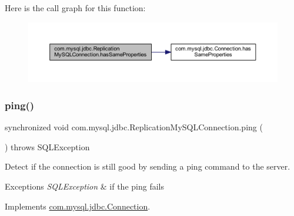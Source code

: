 Here is the call graph for this function\+:
\nopagebreak
\begin{figure}[H]
\begin{center}
\leavevmode
\includegraphics[width=350pt]{classcom_1_1mysql_1_1jdbc_1_1_replication_my_s_q_l_connection_a6add28fadea7fd82449464de48062955_cgraph}
\end{center}
\end{figure}
\mbox{\label{classcom_1_1mysql_1_1jdbc_1_1_replication_my_s_q_l_connection_a2cf454e00e9fe6dcb74bb37405562e6d}} 
\subsubsection{\texorpdfstring{ping()}{ping()}}
{\footnotesize\ttfamily synchronized void com.\+mysql.\+jdbc.\+Replication\+My\+S\+Q\+L\+Connection.\+ping (\begin{DoxyParamCaption}{ }\end{DoxyParamCaption}) throws S\+Q\+L\+Exception}

Detect if the connection is still good by sending a ping command to the server.


\begin{DoxyExceptions}{Exceptions}
{\em S\+Q\+L\+Exception} & if the ping fails \\
\hline
\end{DoxyExceptions}


Implements \mbox{\hyperlink{interfacecom_1_1mysql_1_1jdbc_1_1_connection_a65a9bf75714ed318b0324f99dfa09761}{com.\+mysql.\+jdbc.\+Connection}}.

